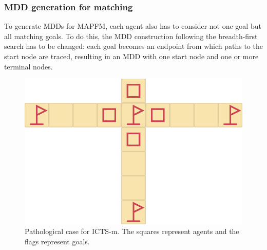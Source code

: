 \documentclass[english]{article}
\begin{document}
	\subsubsection{MDD generation for matching}
	To generate MDDs for MAPFM, each agent also has to consider not one goal but all matching goals. To do this, the MDD construction following the breadth-first search has to be changed: each goal becomes an endpoint from which paths to the start node are traced, resulting in an MDD with one start node and one or more terminal nodes.
	\begin{figure}
		\vspace{-10pt}
		\centering
		\includegraphics[width=\linewidth]{img/path}
		\caption{Pathological case for ICTS-m. The squares represent agents and the flags represent goals.}
		\label{fig:path}
		\vspace{-10pt}
	\end{figure}
\end{document}
